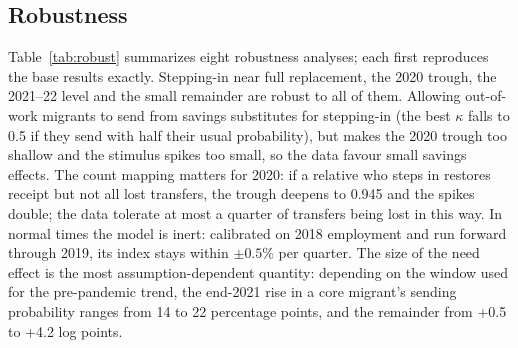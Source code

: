 \documentclass[11pt]{article}
\begin{document}
\subsection{Robustness}

Table~\ref{tab:robust} summarizes eight robustness analyses; each first reproduces the base results exactly. Stepping-in near full replacement, the 2020 trough, the 2021--22 level and the small remainder are robust to all of them. Allowing out-of-work migrants to send from savings substitutes for stepping-in (the best $\kappa$ falls to 0.5 if they send with half their usual probability), but makes the 2020 trough too shallow and the stimulus spikes too small, so the data favour small savings effects. The count mapping matters for 2020: if a relative who steps in restores receipt but not all lost transfers, the trough deepens to 0.945 and the spikes double; the data tolerate at most a quarter of transfers being lost in this way. In normal times the model is inert: calibrated on 2018 employment and run forward through 2019, its index stays within $\pm 0.5\%$ per quarter. The size of the need effect is the most assumption-dependent quantity: depending on the window used for the pre-pandemic trend, the end-2021 rise in a core migrant's sending probability ranges from 14 to 22 percentage points, and the remainder from +0.5 to +4.2 log points.
\end{document}
